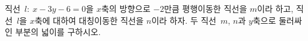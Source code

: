 직선~$l:\ x-3y-6=0$을 $x$축의 방향으로 $-2$만큼 평행이동한 직선을 $m$이라 하고, 직선~$l$을 $x$축에 대하여 대칭이동한 직선을 $n$이라 하자. 두 직선~$m$, $n$과 $y$축으로 둘러싸인 부분의 넓이를 구하시오.
